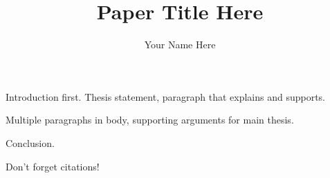 \documentclass{article}
\title{Paper Title Here}
\author{Your Name Here}
\begin{document}
\maketitle

Introduction first. Thesis statement, paragraph that explains and supports.

Multiple paragraphs in body, supporting arguments for main thesis.

Conclusion.

Don't forget citations!
\end{document}
